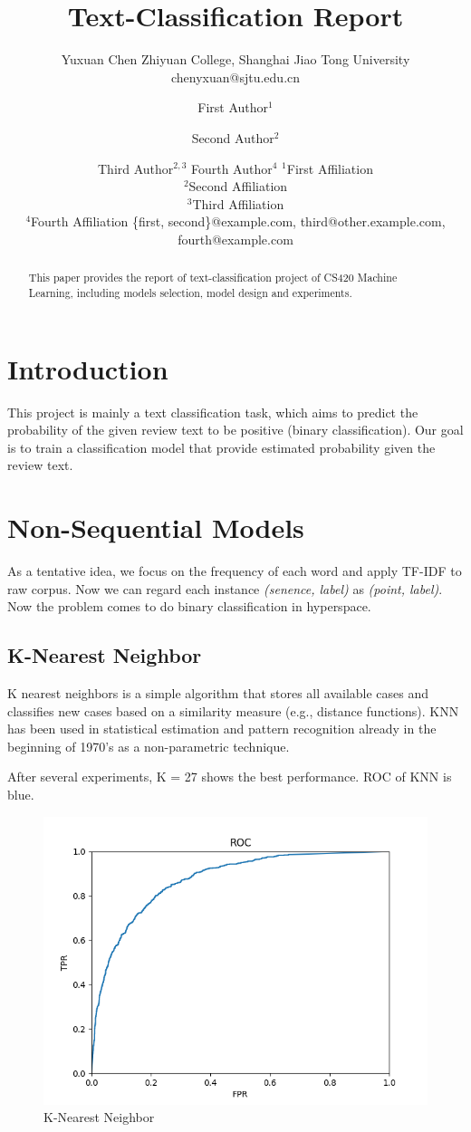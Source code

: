 \documentclass{article}
\title{Text-Classification Report }
\author{
    Yuxuan Chen
    \affiliations
    Zhiyuan College, Shanghai Jiao Tong University \emails
    chenyxuan@sjtu.edu.cn
}
\author{
First Author$^1$
\and
Second Author$^2$\and
Third Author$^{2,3}$\And
Fourth Author$^4$
\affiliations
$^1$First Affiliation\\
$^2$Second Affiliation\\
$^3$Third Affiliation\\
$^4$Fourth Affiliation
\emails
\{first, second\}@example.com,
third@other.example.com,
fourth@example.com
}
\begin{document}
\maketitle

\begin{abstract}
This paper provides the report of text-classification project of CS420 Machine Learning, including models selection, model design and experiments. 
\end{abstract}

\section{Introduction}
\quad This project is mainly a text classification task, which aims to predict the probability of the given review text to be positive (binary classification). Our goal is to train a classification model that provide estimated probability given the review text.

\section{Non-Sequential Models}
\quad As a tentative idea, we focus on the frequency of each word and apply TF-IDF to raw corpus. Now we can regard each instance 
\textsl{(senence, label)} as \textsl{(point, label)}. Now the problem comes to do binary classification in hyperspace.

\subsection{K-Nearest Neighbor}
\quad K nearest neighbors is a simple algorithm that stores all available cases and classifies new cases based on a similarity measure (e.g., distance functions). KNN has been used in statistical estimation and pattern recognition already in the beginning of 1970’s as a non-parametric technique.

After several experiments, K = 27 shows the best performance. ROC of KNN is blue.

\begin{figure}[H]
\centering
\includegraphics[width=.4\textwidth]{KNN.png}
\caption{K-Nearest Neighbor}
\end{figure}
\end{document}
